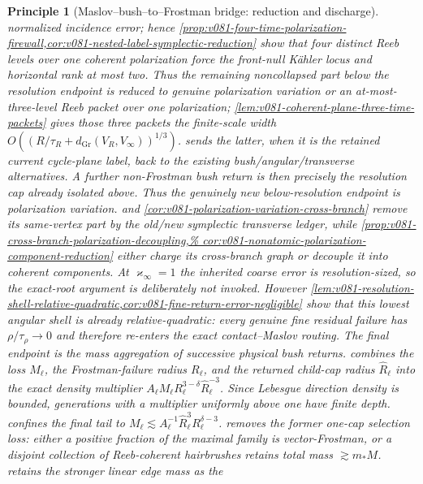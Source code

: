 \documentclass[10pt]{article}
\newtheorem{principle}[theorem]{Principle}
\newcommand{\Gr}{\operatorname{Gr}}
\begin{document}
\begin{principle}[Maslov--bush--to--Frostman bridge: reduction and discharge]
normalized incidence error; hence
\cref{prop:v081-four-time-polarization-firewall,cor:v081-nested-label-symplectic-reduction} show that
four distinct Reeb levels over one coherent polarization force the front-null K\"ahler locus and
horizontal rank at most two.  Thus the remaining noncollapsed part below the resolution endpoint
is reduced to genuine polarization variation or an at-most-three-level Reeb packet over one
polarization; \cref{lem:v081-coherent-plane-three-time-packets} gives those three packets the
finite-scale width \(O((R/\tau_R+d_{\Gr}(V_R,V_\infty))^{1/3})\).
 sends the latter, when it is the retained
current cycle-plane label, back to the existing bush/angular/transverse alternatives.  A further
non-Frostman bush return is then precisely the resolution cap already isolated above.  Thus the
genuinely new below-resolution endpoint is polarization variation.   and
\cref{cor:v081-polarization-variation-cross-branch} remove its same-vertex part by the old/new
symplectic transverse ledger, while
\cref{prop:v081-cross-branch-polarization-decoupling,%
cor:v081-nonatomic-polarization-component-reduction} either charge its cross-branch graph or
decouple it into coherent components.  At \(\varkappa_\infty=1\) the inherited coarse error is
resolution-sized, so the exact-root argument is deliberately not invoked.  However
\cref{lem:v081-resolution-shell-relative-quadratic,cor:v081-fine-return-error-negligible} show that
this lowest angular shell is already relative-quadratic: every genuine fine residual failure has
\(\rho/\tau_\rho\to0\) and therefore re-enters the exact contact--Maslov routing.  The final
endpoint is the mass aggregation of successive physical bush returns.   combines the loss \(M_\ell\), the Frostman-failure
radius \(R_\ell\), and the returned child-cap radius \(\widehat R_\ell\) into the exact density
multiplier
\(A_\ell M_\ell R_\ell^{3-\delta}\widehat R_\ell^{-3}\).  Since Lebesgue direction density is
bounded, generations with a multiplier uniformly above one have finite depth.   confines the final tail to
\(M_\ell\lesssim A_\ell^{-1}\widehat R_\ell^3R_\ell^{\delta-3}\).   removes the former one-cap selection loss:
either a positive fraction of the maximal family is vector-Frostman, or a disjoint collection of
Reeb-coherent hairbrushes retains total mass \(\gtrsim m_*M\).   retains the stronger linear edge mass as the

\end{principle}
\end{document}
